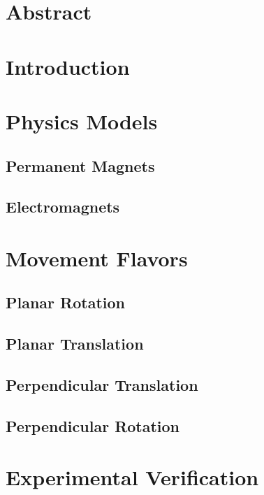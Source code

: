 \documentclass[10pt]{article}
\begin{document}
\section{Abstract}
\section{Introduction}
\section{Physics Models}
\subsection{Permanent Magnets}
\subsection{Electromagnets}
\section{Movement Flavors}
\subsection{Planar Rotation}
\subsection{Planar Translation}
\subsection{Perpendicular Translation}
\subsection{Perpendicular Rotation}
\section{Experimental Verification}
\end{document}
